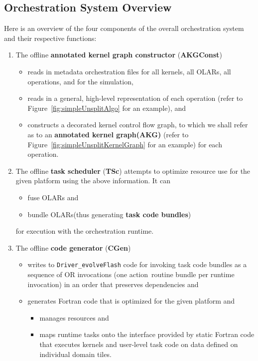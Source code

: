 \documentclass{article}
\newcommand{\spelledoutAKG}  {annotated kernel graph\xspace}
\newcommand{\spelledoutKGC}  {annotated kernel graph constructor\xspace}
\newcommand{\shortAKG}   {AKG\xspace}
\newcommand{\shortOLARs} {OLARs\xspace}
\newcommand{\shortKGC}  {AKGConst\xspace}     %
\newcommand{\shortTS}   {TSc\xspace}      %
\newcommand{\shortCG}   {CGen\xspace}     %
\newcommand{\shortOR}   {OR\xspace}
\newcommand{\OLARs}  {\shortOLARs}             %
\newcommand{\OR}        {\shortOR}
\newcommand{\taskcodebundles}    {task code bundles\xspace}
\newcommand{\qsaa}                   {action\ }                 %
\newcommand{\actionroutinebundle}  {\qsaa routine bundle\xspace}  %
\begin{document}
\subsection{Orchestration System Overview}
Here is an overview  of the four components of the overall orchestration system
and their respective functions:
\begin{enumerate}
\item{The offline \textbf{\spelledoutKGC} (\textbf{\shortKGC})}
    \begin{itemize}
    \item{reads in metadata orchestration files for all kernels, all \OLARs, all
    operations, and for the simulation,}
    \item{reads in a general, high-level representation of each operation (refer
    to Figure~\ref{fig:simpleUnsplitAlgo} for an example), and}
    \item{constructs a decorated kernel control flow graph,
    to which we shall refer as to an \textbf{\spelledoutAKG (\shortAKG)} (refer to
    Figure~\ref{fig:simpleUnsplitKernelGraph} for an example) for each operation.}
    \end{itemize}
\item{The offline \textbf{task scheduler} (\textbf{\shortTS}) attempts to optimize resource use
for the given platform using the above information. It can
    \begin{itemize}
    \item fuse \OLARs and
    \item bundle \OLARs (thus generating \textbf{\taskcodebundles})
    \end{itemize}
    for execution with the orchestration runtime.}
\item{The offline \textbf{code generator} (\textbf{\shortCG})}
    \begin{itemize}
    \item{writes to \texttt{Driver\_evolveFlash} code for invoking \taskcodebundles
    as a sequence of \OR invocations (one
    \actionroutinebundle per runtime invocation) in an order that preserves dependencies and}
    \item generates Fortran code that is optimized for the given platform and
      \begin{itemize}
        \item manages resources and
        \item maps
    runtime tasks onto the interface provided by static Fortran code that executes kernels
    and user-level task code on data defined on individual domain tiles.

\end{itemize}
\end{itemize}
\end{enumerate}
\end{document}
